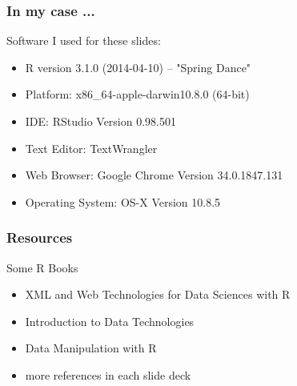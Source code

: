 \documentclass{beamer}\usepackage[]{graphicx}\usepackage[]{color}
\begin{document}

\begin{frame}
\frametitle{In my case ...}

\begin{block}{Software I used for these slides:}
 \begin{itemize}
  \item R version 3.1.0 (2014-04-10) -- "Spring Dance"
  \item Platform: x86\_64-apple-darwin10.8.0 (64-bit)
  \item IDE: RStudio Version 0.98.501
  \item Text Editor: TextWrangler
  \item Web Browser: Google Chrome Version 34.0.1847.131
  \item Operating System: OS-X Version 10.8.5
 \end{itemize}
\end{block}

\end{frame}


\begin{frame}
\frametitle{Resources}

\begin{block}{Some R Books}
 \begin{itemize}
  \item XML and Web Technologies for Data Sciences with R \\ 
  \item Introduction to Data Technologies \\ 
  \item Data Manipulation with R \\ 
  \item more references in each slide deck
 \end{itemize}
\end{block}

\end{frame}

\end{document}
